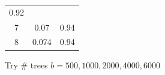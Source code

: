 \documentclass[]{article}
\begin{document}
\begin{longtable}[]{@{}ccc@{}}
\begin{minipage}[t]{0.13\columnwidth}
0.92\strut
\end{minipage}\tabularnewline
\begin{minipage}[t]{0.05\columnwidth}\centering\strut
7\strut
\end{minipage} & \begin{minipage}[t]{0.10\columnwidth}\centering\strut
0.07\strut
\end{minipage} & \begin{minipage}[t]{0.13\columnwidth}\centering\strut
0.94\strut
\end{minipage}\tabularnewline
\begin{minipage}[t]{0.05\columnwidth}\centering\strut
8\strut
\end{minipage} & \begin{minipage}[t]{0.10\columnwidth}\centering\strut
0.074\strut
\end{minipage} & \begin{minipage}[t]{0.13\columnwidth}\centering\strut
0.94\strut
\end{minipage}\tabularnewline
\bottomrule
\end{longtable}

Try \# trees \(b = 500, 1000, 2000, 4000, 6000\)
\end{document}
